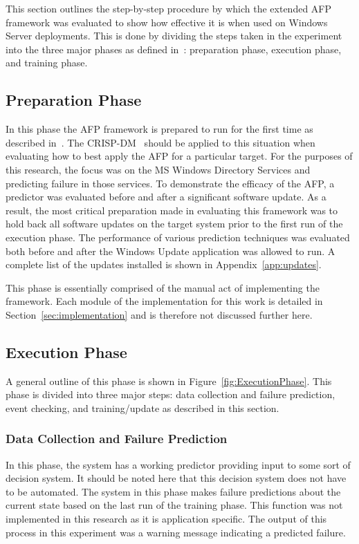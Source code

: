 This section outlines the step-by-step procedure by which the extended \ac{AFP}
framework was evaluated to show how effective it is when used on Windows Server
deployments.  This is done by dividing the steps taken in the experiment into
the three major phases as defined in~\cite{irrera2015}: preparation phase,
execution phase, and training phase.

\subsection{Preparation Phase}
In this phase the \ac{AFP} framework is prepared to run for the first time as
described in~\cite{irrera2015}.  The \ac{CRISP-DM}~\cite{crispdm} should be
applied to this situation when evaluating how to best apply the \ac{AFP} for a
particular target.  For the purposes of this research, the focus was on the
\ac{MS} Windows Directory Services and predicting failure in those services.
To demonstrate the efficacy of the \ac{AFP}, a predictor was evaluated before
and after a significant software update.  As a result, the most critical
preparation made in evaluating this framework was to hold back all software
updates on the target system prior to the first run of the execution phase.
The performance of various prediction techniques was evaluated both before and
after the Windows Update application was allowed to run.  A complete list of
the updates installed is shown in Appendix~\ref{app:updates}.

This phase is essentially comprised of the manual act of implementing the
framework.  Each module of the implementation for this work is detailed in
Section~\ref{sec:implementation} and is therefore not discussed further here.  

\subsection{Execution Phase}
A general outline of this phase is shown in Figure~\ref{fig:ExecutionPhase}.
This phase is divided into three major steps: data collection and failure
prediction, event checking, and training/update as described in this section.

\figExecutionPhase{2.5in}

\subsubsection{Data Collection and Failure Prediction}
In this phase, the system has a working predictor providing input to some sort
of decision system.  It should be noted here that this decision system does not
have to be automated.  The system in this phase makes failure predictions about
the current state based on the last run of the training phase.  This function
was not implemented in this research as it is application specific.  The output
of this process in this experiment was a warning message indicating a predicted
failure.

